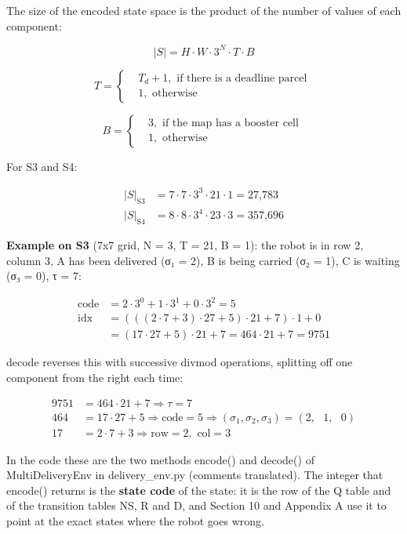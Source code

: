 \documentclass[12pt,a4paper]{article}
\begin{document}
The size of the encoded state space is the product of the number of
values of each component:

\[|S| = H \cdot W \cdot 3^{N} \cdot T \cdot B\]

\[T = \left\{ \begin{aligned}
 & T_{d} + 1,\text{ if there is a deadline parcel} \\
 & 1,\text{ otherwise}
\end{aligned} \right.\ \]

\[B = \left\{ \begin{aligned}
 & 3,\text{ if the map has a booster cell} \\
 & 1,\text{ otherwise}
\end{aligned} \right.\ \]

For S3 and S4:

\[\begin{aligned}
{|S|}_{\text{S3}} & = 7 \cdot 7 \cdot 3^{3} \cdot 21 \cdot 1 = \text{27,783} \\
{|S|}_{\text{S4}} & = 8 \cdot 8 \cdot 3^{4} \cdot 23 \cdot 3 = \text{357,696}
\end{aligned}\]

\textbf{Example on S3} (7x7 grid, N = 3, T = 21, B = 1): the robot is in
row 2, column 3, A has been delivered (σ₁ = 2), B is being carried (σ₂ =
1), C is waiting (σ₃ = 0), τ = 7:

\[\begin{aligned}
\text{code} & = 2 \cdot 3^{0} + 1 \cdot 3^{1} + 0 \cdot 3^{2} = 5 \\
\text{idx} & = (((2 \cdot 7 + 3) \cdot 27 + 5) \cdot 21 + 7) \cdot 1 + 0 \\
 & = (17 \cdot 27 + 5) \cdot 21 + 7 = 464 \cdot 21 + 7 = 9751
\end{aligned}\]

decode reverses this with successive divmod operations, splitting off
one component from the right each time:

\[\begin{aligned}
9751 & = 464 \cdot 21 + 7 \Rightarrow \tau = 7 \\
464 & = 17 \cdot 27 + 5 \Rightarrow \text{code} = 5 \Rightarrow \left( \sigma_{1},\sigma_{2},\sigma_{3} \right) = \left( 2,\text{ }1,\text{ }0 \right) \\
17 & = 2 \cdot 7 + 3 \Rightarrow \text{row} = 2,\text{ col} = 3
\end{aligned}\]

In the code these are the two methods encode() and decode() of
MultiDeliveryEnv in delivery\_env.py (comments translated). The integer
that encode() returns is the \textbf{state code} of the state: it is the
row of the Q table and of the transition tables NS, R and D, and Section
10 and Appendix A use it to point at the exact states where the robot
goes wrong.
\end{document}

